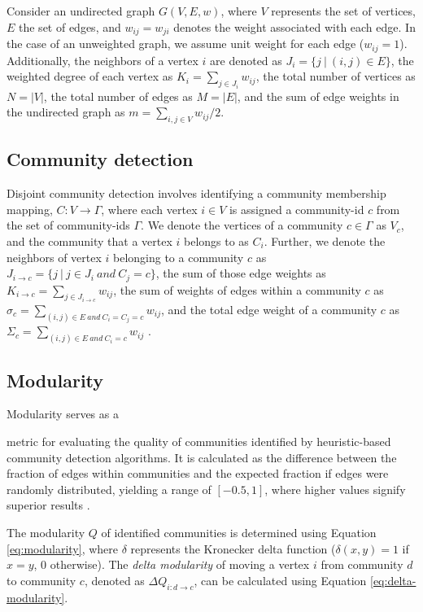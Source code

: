 Consider an undirected graph $G(V, E, w)$, where $V$ represents the set of vertices, $E$ the set of edges, and $w_{ij} = w_{ji}$ denotes the weight associated with each edge. In the case of an unweighted graph, we assume unit weight for each edge ($w_{ij} = 1$). Additionally, the neighbors of a vertex $i$ are denoted as $J_i = \{j\ |\ (i, j) \in E\}$, the weighted degree of each vertex as $K_i = \sum_{j \in J_i} w_{ij}$, the total number of vertices as $N = |V|$, the total number of edges as $M = |E|$, and the sum of edge weights in the undirected graph as $m = \sum_{i, j \in V} w_{ij}/2$.




\subsection{Community detection}

Disjoint community detection involves identifying a community membership mapping, $C: V \rightarrow \Gamma$, where each vertex $i \in V$ is assigned a community-id $c$ from the set of community-ids $\Gamma$. We denote the vertices of a community $c \in \Gamma$ as $V_c$, and the community that a vertex $i$ belongs to as $C_i$. Further, we denote the neighbors of vertex $i$ belonging to a community $c$ as $J_{i \rightarrow c} = \{j\ |\ j \in J_i\ and\ C_j = c\}$, the sum of those edge weights as $K_{i \rightarrow c} = \sum_{j \in J_{i \rightarrow c}} w_{ij}$, the sum of weights of edges within a community $c$ as $\sigma_c = \sum_{(i, j) \in E\ and\ C_i = C_j = c} w_{ij}$, and the total edge weight of a community $c$ as $\Sigma_c = \sum_{(i, j) \in E\ and\ C_i = c} w_{ij}$ \cite{com-leskovec21}.




\subsection{Modularity}

Modularity serves as a metric for evaluating the quality of communities identified by heuristic-based community detection algorithms. It is calculated as the difference between the fraction of edges within communities and the expected fraction if edges were randomly distributed, yielding a range of $[-0.5, 1]$, where higher values signify superior results \cite{com-brandes07}. The modularity $Q$ of identified communities is determined using Equation \ref{eq:modularity}, where $\delta$ represents the Kronecker delta function ($\delta (x,y)=1$ if $x=y$, $0$ otherwise). The \textit{delta modularity} of moving a vertex $i$ from community $d$ to community $c$, denoted as $\Delta Q_{i: d \rightarrow c}$, can be calculated using Equation \ref{eq:delta-modularity}.


